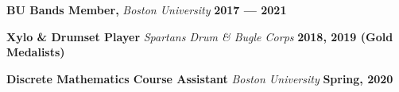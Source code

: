 {\bfseries BU Bands Member,} \textit{Boston University}	\hfill {\bfseries 2017 --- 2021}

{\bfseries Xylo \& Drumset Player} \textit{Spartans Drum \& Bugle Corps}	\hfill {\bfseries 2018, 2019 (Gold Medalists)}

{\bfseries Discrete Mathematics Course Assistant} \textit{Boston University}	\hfill {\bfseries Spring, 2020}